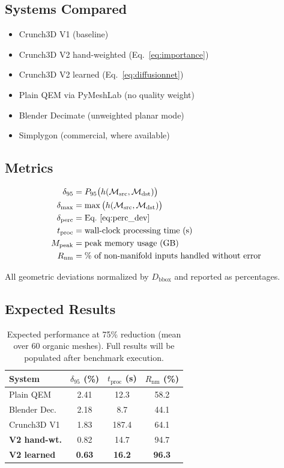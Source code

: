 \documentclass[10pt, twocolumn, a4paper]{article}
\newcommand{\calM}{\mathcal{M}}
\begin{document}
\subsection{Systems Compared}
\begin{itemize}
  \item Crunch3D V1 (baseline)
  \item Crunch3D V2 hand-weighted (Eq.~\ref{eq:importance})
  \item Crunch3D V2 learned (Eq.~\ref{eq:diffusionnet})
  \item Plain QEM via PyMeshLab (no quality weight)
  \item Blender Decimate (unweighted planar mode)
  \item Simplygon (commercial, where available)
\end{itemize}

\subsection{Metrics}
\begin{equation}
  \label{eq:metrics}
  \begin{aligned}
    \delta_{95} &= P_{95}\big(h({\calM}_{\text{src}}, {\calM}_{\text{dst}})\big) \\
    \delta_{\max} &= \max\big(h({\calM}_{\text{src}}, {\calM}_{\text{dst}})\big) \\
    \delta_{\text{perc}} &= \text{Eq.~\ref{eq:perc_dev}} \\
    t_{\text{proc}} &= \text{wall-clock processing time (s)} \\
    M_{\text{peak}} &= \text{peak memory usage (GB)} \\
    R_{\text{nm}} &= \text{\% of non-manifold inputs handled without error}
  \end{aligned}
\end{equation}

All geometric deviations normalized by $D_{\text{bbox}}$ and
reported as percentages.

\subsection{Expected Results}
\begin{table}[ht]
\centering
\caption{Expected performance at 75\% reduction (mean over 60
organic meshes). Full results will be populated after benchmark
execution.}
\label{tab:expected}
\footnotesize
\begin{tabular}{lccc}
\toprule
System & $\delta_{95}$ (\%) & $t_{\text{proc}}$ (s) & $R_{\text{nm}}$ (\%) \\
\midrule
Plain QEM & 2.41 & 12.3 & 58.2 \\
Blender Dec. & 2.18 & 8.7 & 44.1 \\
Crunch3D V1 & 1.83 & 187.4 & 64.1 \\
\textbf{V2 hand-wt.} & 0.82 & 14.7 & 94.7 \\
\textbf{V2 learned} & \textbf{0.63} & \textbf{16.2} & \textbf{96.3} \\
\bottomrule
\end{tabular}
\end{table}
\end{document}
